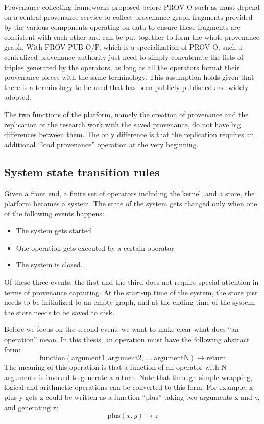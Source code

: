 Provenance collecting frameworks proposed before PROV-O such as \cite{simmhan2006framework} must depend on a central provenance service to collect provenance graph fragments provided by the various components operating on data to ensure these fragments are consistent with each other and can be put together to form the whole provenance graph. With PROV-PUB-O/P, which is a specialization of PROV-O, such a centralized provenance authority just need to simply concatenate the lists of triples generated by the operators, as long as all the operators format their provenance pieces with the same terminology. This assumption holds given that there is a terminology to be used that has been publicly published and widely adopted.

The two functions of the platform, namely the creation of provenance and the replication of the research work with the saved provenance, do not have big differences between them. The only difference is that the replication requires an additional ``load provenance'' operation at the very beginning.

\subsection{System state transition rules}
\label{sec:transition}
Given a front end, a finite set of operators including the kernel, and a store, the platform becomes a system. The state of the system gets changed only when one of the following events happens:
\begin{itemize}
	\item The system gets started.
	\item One operation gets executed by a certain operator.
	\item The system is closed.
\end{itemize}
Of these three events, the first and the third does not require special attention in terms of provenance capturing. At the start-up time of the system, the store just needs to be initialized to an empty graph, and at the ending time of the system, the store needs to be saved to disk.

Before we focus on the second event, we want to make clear what does ``an operation'' mean. In this thesis, an operation must have the following abstract form:
\begin{equation}
\textrm{function}(\textrm{argument1}, \textrm{argument2}, \dots, \textrm{argumentN})\rightarrow \textrm{return}
\end{equation}
The meaning of this operation is that a function of an operator with N arguments is invoked to generate a return. Note that through simple wrapping, logical and arithmetic operations can be converted to this form. For example, x plus y gets z could be written as a function ``plus'' taking two arguments x and y, and generating z:
\begin{equation}
\textrm{plus}(x, y)\rightarrow z
\end{equation}

